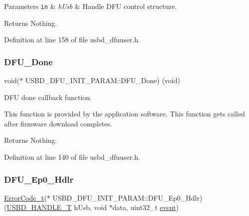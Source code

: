 \begin{DoxyParams}[1]{Parameters}
\mbox{\tt in}  & {\em h\+Usb} & Handle D\+FU control structure. \\
\hline
\end{DoxyParams}
\begin{DoxyReturn}{Returns}
Nothing. 
\end{DoxyReturn}


Definition at line 158 of file usbd\+\_\+dfuuser.\+h.

\mbox{\label{struct_u_s_b_d___d_f_u___i_n_i_t___p_a_r_a_m_ace12153364bebed4b022776bcdf4574f}} 
\subsubsection{\texorpdfstring{D\+F\+U\+\_\+\+Done}{DFU\_Done}}
{\footnotesize\ttfamily void($\ast$ U\+S\+B\+D\+\_\+\+D\+F\+U\+\_\+\+I\+N\+I\+T\+\_\+\+P\+A\+R\+A\+M\+::\+D\+F\+U\+\_\+\+Done) (void)}

D\+FU done callback function.

This function is provided by the application software. This function gets called after firmware download completes.

\begin{DoxyReturn}{Returns}
Nothing. 
\end{DoxyReturn}


Definition at line 140 of file usbd\+\_\+dfuuser.\+h.

\mbox{\label{struct_u_s_b_d___d_f_u___i_n_i_t___p_a_r_a_m_a066ab927ae9d87ecac1113648ecb51c6}} 
\subsubsection{\texorpdfstring{D\+F\+U\+\_\+\+Ep0\+\_\+\+Hdlr}{DFU\_Ep0\_Hdlr}}
{\footnotesize\ttfamily \hyperlink{error_8h_a905255056c349318139d94aa4523d516}{Error\+Code\+\_\+t}($\ast$ U\+S\+B\+D\+\_\+\+D\+F\+U\+\_\+\+I\+N\+I\+T\+\_\+\+P\+A\+R\+A\+M\+::\+D\+F\+U\+\_\+\+Ep0\+\_\+\+Hdlr) (\hyperlink{group___u_s_b_d___core_gafdbb2204d929cb9d75736bd2b42342ac}{U\+S\+B\+D\+\_\+\+H\+A\+N\+D\+L\+E\+\_\+T} h\+Usb, void $\ast$data, uint32\+\_\+t \hyperlink{structevent}{event})}

